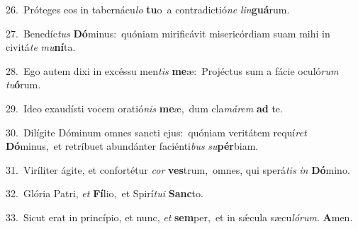{\numbfont\textcolor{\numbcolor}{26.}}~Próteges eos in tabernácu\textit{lo} \textbf{tu}\-o~\star a contradictió\textit{ne} \textit{lin}\-\textbf{guá}rum.\par
{\numbfont\textcolor{\numbcolor}{27.}}~Benedíc\textit{tus} \textbf{Dó}\-minus:~\star quóniam mirificávit misericórdiam suam mihi in civitá\textit{te} \textit{mu}\-\textbf{ní}ta.\par
{\numbfont\textcolor{\numbcolor}{28.}}~Ego autem dixi in excéssu men\textit{tis} \textbf{me}\-æ:~\star Projéctus sum a fácie oculó\textit{rum} \textit{tu}\-\textbf{ó}rum.\par
{\numbfont\textcolor{\numbcolor}{29.}}~Ideo exaudísti vocem oratió\textit{nis} \textbf{me}\-æ,~\star dum cla\-\textit{má}\-\textit{rem} \textbf{ad} te.\par
{\numbfont\textcolor{\numbcolor}{30.}}~Dilígite Dóminum omnes sancti ejus:~\dagger quóniam veritátem requí\textit{ret} \textbf{Dó}\-minus,~\star et retríbuet abundánter faciénti\textit{bus} \textit{su}\-\textbf{pér}biam.\par
{\numbfont\textcolor{\numbcolor}{31.}}~Viríliter ágite, et confortétur \textit{cor} \textbf{ves}\-trum,~\star omnes, qui sperá\textit{tis} \textit{in} \textbf{Dó}\-mino.\par
{\numbfont\textcolor{\numbcolor}{32.}}~Glória Patri, \textit{et} \textbf{Fí}\-lio,~\star et Spirí\-\textit{tu}\-\textit{i} \textbf{Sanc}\-to.\par
{\numbfont\textcolor{\numbcolor}{33.}}~Sicut erat in princípio, et nunc, \textit{et} \textbf{sem}\-per,~\star et in sǽcula sæcu\-\textit{ló}\-\textit{rum}. \textbf{A}\-men.\par
